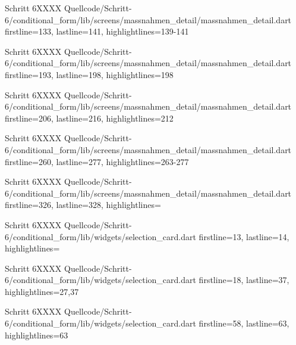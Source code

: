 


  \begin{alexlisting}{Schritt 6}{XXXX}
    {Quellcode/Schritt-6/conditional_form/lib/screens/massnahmen_detail/massnahmen_detail.dart}
    {firstline=133, lastline=141, highlightlines={139-141}}
    \label{lst:Schritt6XXXXX}
  \end{alexlisting}

  \begin{alexlisting}{Schritt 6}{XXXX}
    {Quellcode/Schritt-6/conditional_form/lib/screens/massnahmen_detail/massnahmen_detail.dart}
    {firstline=193, lastline=198, highlightlines={198}}
    \label{lst:Schritt6XXXXX}
  \end{alexlisting}

  \begin{alexlisting}{Schritt 6}{XXXX}
    {Quellcode/Schritt-6/conditional_form/lib/screens/massnahmen_detail/massnahmen_detail.dart}
    {firstline=206, lastline=216, highlightlines={212}}
    \label{lst:Schritt6XXXXX}
  \end{alexlisting}

  \begin{alexlisting}{Schritt 6}{XXXX}
    {Quellcode/Schritt-6/conditional_form/lib/screens/massnahmen_detail/massnahmen_detail.dart}
    {firstline=260, lastline=277, highlightlines={263-277}}
    \label{lst:Schritt6XXXXX}
  \end{alexlisting}

  \begin{alexlisting}{Schritt 6}{XXXX}
    {Quellcode/Schritt-6/conditional_form/lib/screens/massnahmen_detail/massnahmen_detail.dart}
    {firstline=326, lastline=328, highlightlines={}}
    \label{lst:Schritt6XXXXX}
  \end{alexlisting}


  \begin{alexlisting}{Schritt 6}{XXXX}
    {Quellcode/Schritt-6/conditional_form/lib/widgets/selection_card.dart}
    {firstline=13, lastline=14, highlightlines={}}
    \label{lst:Schritt6XXXX}
\end{alexlisting}

\begin{alexlisting}{Schritt 6}{XXXX}
    {Quellcode/Schritt-6/conditional_form/lib/widgets/selection_card.dart}
    {firstline=18, lastline=37, highlightlines={27,37}}
    \label{lst:Schritt6XXXX}
\end{alexlisting}

\begin{alexlisting}{Schritt 6}{XXXX}
    {Quellcode/Schritt-6/conditional_form/lib/widgets/selection_card.dart}
    {firstline=58, lastline=63, highlightlines={63}}
    \label{lst:Schritt6XXXX}
\end{alexlisting}

